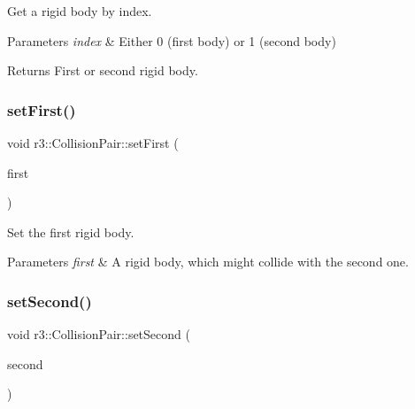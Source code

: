 Get a rigid body by index. 


\begin{DoxyParams}{Parameters}
{\em index} & Either 0 (first body) or 1 (second body) \\
\hline
\end{DoxyParams}
\begin{DoxyReturn}{Returns}
First or second rigid body. 
\end{DoxyReturn}
\mbox{\label{classr3_1_1_collision_pair_ac900e6382810b6820dc3f4ecf832bb6b}} 
\subsubsection{\texorpdfstring{set\+First()}{setFirst()}}
{\footnotesize\ttfamily void r3\+::\+Collision\+Pair\+::set\+First (\begin{DoxyParamCaption}\item[{\mbox{\hyperlink{classr3_1_1_rigid_body}{Rigid\+Body}} $\ast$}]{first }\end{DoxyParamCaption})}



Set the first rigid body. 


\begin{DoxyParams}{Parameters}
{\em first} & A rigid body, which might collide with the second one. \\
\hline
\end{DoxyParams}
\mbox{\label{classr3_1_1_collision_pair_acb8c2f4a2c44eeffb8a3d76023db985b}} 
\subsubsection{\texorpdfstring{set\+Second()}{setSecond()}}
{\footnotesize\ttfamily void r3\+::\+Collision\+Pair\+::set\+Second (\begin{DoxyParamCaption}\item[{\mbox{\hyperlink{classr3_1_1_rigid_body}{Rigid\+Body}} $\ast$}]{second }\end{DoxyParamCaption})}



